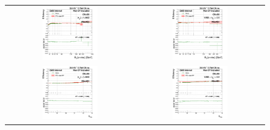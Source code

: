 \begin{figure}[bh]
  \begin{center}
    \begin{tabular}{cc}
      \includegraphics[width=0.45\textwidth]{figures/Zprime/2016/ScaleFactor/SameSign/N_1_eff/g_compare_cut_Et_Barrel_ea_ta_inc_AS_N_1_EMHD1Iso_PUW.png} &
      \includegraphics[width=0.45\textwidth]{figures/Zprime/2016/ScaleFactor/SameSign/N_1_eff/g_compare_cut_Et_Endcap_ea_ta_inc_AS_N_1_EMHD1Iso_PUW.png} \\
      \includegraphics[width=0.45\textwidth]{figures/Zprime/2016/ScaleFactor/SameSign/N_1_eff/g_compare_cut_nVtx_Barrel_ea_ta_inc_AS_N_1_EMHD1Iso_PUW.png} &
      \includegraphics[width=0.45\textwidth]{figures/Zprime/2016/ScaleFactor/SameSign/N_1_eff/g_compare_cut_nVtx_Endcap_ea_ta_inc_AS_N_1_EMHD1Iso_PUW.png} \\

\end{tabular}
\end{center}
\end{figure}
